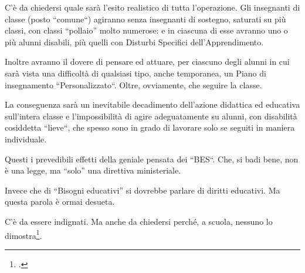 C'è da chiedersi quale sarà l'esito realistico di tutta l'operazione. Gli insegnanti di classe (posto “comune“) agiranno senza insegnanti di sostegno, saturati su più classi, con classi “pollaio” molto numerose: e in ciascuna di esse avranno uno o più alunni disabili, più quelli con Disturbi Specifici dell'Apprendimento.

Inoltre avranno il dovere di pensare ed attuare, per ciascuno degli alunni in cui sarà vista una difficoltà di qualsiasi tipo, anche temporanea, un Piano di insegnamento “Personalizzato“. Oltre, ovviamente, che seguire la classe.

La conseguenza sarà un inevitabile decadimento dell'azione didattica ed educativa sull'intera classe e l'impossibilità di agire adeguatamente su alunni, con disabilità cosiddetta “lieve“, che spesso sono in grado di lavorare solo se seguiti in maniera individuale.

Questi i prevedibili effetti della geniale pensata dei “BES“.
Che, si badi bene, non è una legge, ma “solo” una direttiva ministeriale.

Invece che di “Bisogni educativi” si dovrebbe parlare di diritti educativi. Ma questa parola è ormai desueta.

C'è da essere indignati.
Ma anche da chiedersi perché, a scuola, nessuno lo dimostra\footcite{Avossa2013}.